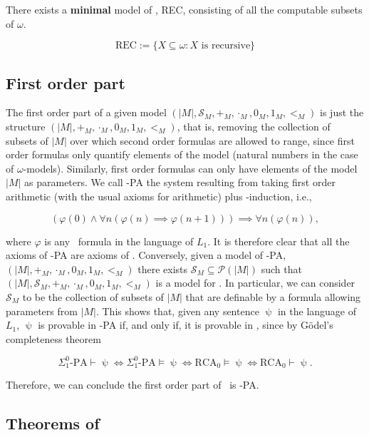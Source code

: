 \documentclass[../main.tex]{memoir}
\begin{document}
\begin{corollary}
  \label{corollary:rec-model}
  There exists a \textbf{minimal} model of \rca, REC, consisting of all the computable subsets of $\omega$.

  \[ \text{REC} := \{X \subseteq \omega: X \text{ is recursive}\} \]
\end{corollary}

\subsection{First order part}

The first order part of a given model $(|M|, \mathcal{S}_M, +_M, \cdot_M, 0_M, 1_M, <_M)$ is just the structure $(|M|, +_M, \cdot_M, 0_M, 1_M, <_M)$, that is, removing the collection of subsets of $|M|$ over which second order formulas are allowed to range, since first order formulas only quantify elements of the model (natural numbers in the case of $\omega$-models). Similarly, first order formulas can only have elements of the model $|M|$ as parameters. We call \re-PA the system resulting from taking first order arithmetic (with the usual axioms for arithmetic) plus \re-induction, i.e.,

\[ (\varphi(0) \land \forall n (\varphi(n) \implies \varphi(n + 1))) \implies \forall n (\varphi(n)), \]

where $\varphi$ is any \re\ formula in the language of $L_1$. It is therefore clear that all the axioms of \re-PA are axioms of \rca. Conversely, given a model of \re-PA, $(|M|, +_M, \cdot_M, 0_M, 1_M, <_M)$ there exists $\mathcal{S}_M \subseteq \mathcal{P}(|M|)$ such that $(|M|, \mathcal{S}_M, +_M, \cdot_M, 0_M, 1_M, <_M)$ is a model for \rca. In particular, we can consider $\mathcal{S}_M$ to be the collection of subsets of $|M|$ that are definable by a \rec formula allowing parameters from $|M|$. This shows that, given any sentence $\uppsi$ in the language of $L_1$, $\uppsi$ is provable in \re-PA if, and only if, it is provable in \rca, since by Gödel's completeness theorem

\[ \Sigma_1^0\text{-PA} \vdash \uppsi \iff \Sigma_1^0\text{-PA} \vDash \uppsi \iff \text{RCA}_0 \vDash \uppsi \iff \text{RCA}_0 \vdash \uppsi. \]

Therefore, we can conclude the first order part of \rca\ is \re-PA.

\subsection{Theorems of \rca}
\end{document}
